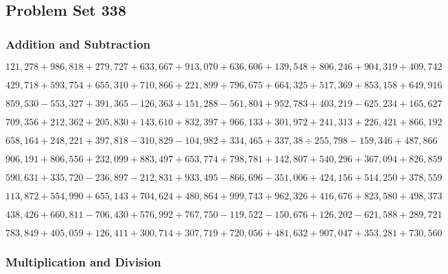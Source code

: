 \hypertarget{problem-set-338}{%
\subsection{Problem Set 338}\label{problem-set-338}}

\hypertarget{addition-and-subtraction}{%
\subsubsection{Addition and
Subtraction}\label{addition-and-subtraction}}

\(121,278+986,818+279,727+633,667+913,070+636,606+139,548+806,246+904,319+409,742\)

\(429,718+593,754+655,310+710,866+221,899+796,675+664,325+517,369+853,158+649,916\)

\(859,530-553,327+391,365-126,363+151,288-561,804+952,783+403,219-625,234+165,627\)

\(709,356+212,362+205,830+143,610+832,397+966,133+301,972+241,313+226,421+866,192\)

\(658,164+248,221+397,818-310,829-104,982+334,465+337,38÷255,798-159,346+487,866\)

\(906,191+806,556+232,099+883,497+653,774+798,781+142,807+540,296+367,094+826,859\)

\(590,631+335,720-236,897-212,831+933,495-866,696-351,006+424,156+514,250+378,559\)

\(113,872+554,990+655,143+704,624+480,864+999,743+962,326+416,676+823,580+498,373\)

\(438,426+660,811-706,430+576,992+767,750-119,522-150,676+126,202-621,588+289,721\)

\(783,849+405,059+126,411+300,714+307,719+720,056+481,632+907,047+353,281+730,560\)

\hypertarget{multiplication-and-division}{%
\subsubsection{Multiplication and
Division}\label{multiplication-and-division}}

